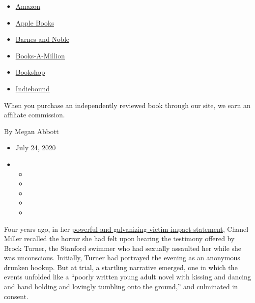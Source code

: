 \begin{itemize}
\tightlist
\item
  \href{https://www.amazon.com/gp/search?index=books\&tag=NYTBSREV-20\&field-keywords=True+Story+Kate+Reed+Petty}{Amazon}
\item
  \href{https://du-gae-books-dot-nyt-du-prd.appspot.com/buy?title=True+Story\&author=Kate+Reed+Petty}{Apple
  Books}
\item
  \href{https://www.anrdoezrs.net/click-7990613-11819508?url=https\%3A\%2F\%2Fwww.barnesandnoble.com\%2Fw\%2F\%3Fean\%3D9781984877680}{Barnes
  and Noble}
\item
  \href{https://www.anrdoezrs.net/click-7990613-35140?url=https\%3A\%2F\%2Fwww.booksamillion.com\%2Fp\%2FTrue\%2BStory\%2FKate\%2BReed\%2BPetty\%2F9781984877680}{Books-A-Million}
\item
  \href{https://bookshop.org/a/3546/9781984877680}{Bookshop}
\item
  \href{https://www.indiebound.org/book/9781984877680?aff=NYT}{Indiebound}
\end{itemize}

When you purchase an independently reviewed book through our site, we
earn an affiliate commission.

By Megan Abbott

\begin{itemize}
\item
  July 24, 2020
\item
  \begin{itemize}
  \item
  \item
  \item
  \item
  \item
  \end{itemize}
\end{itemize}

Four years ago, in her
\href{https://www.buzzfeednews.com/article/katiejmbaker/heres-the-powerful-letter-the-stanford-victim-read-to-her-ra}{powerful
and galvanizing victim impact statement}, Chanel Miller recalled the
horror she had felt upon hearing the testimony offered by Brock Turner,
the Stanford swimmer who had sexually assaulted her while she was
unconscious. Initially, Turner had portrayed the evening as an anonymous
drunken hookup. But at trial, a startling narrative emerged, one in
which the events unfolded like a ``poorly written young adult novel with
kissing and dancing and hand holding and lovingly tumbling onto the
ground,'' and culminated in consent.

